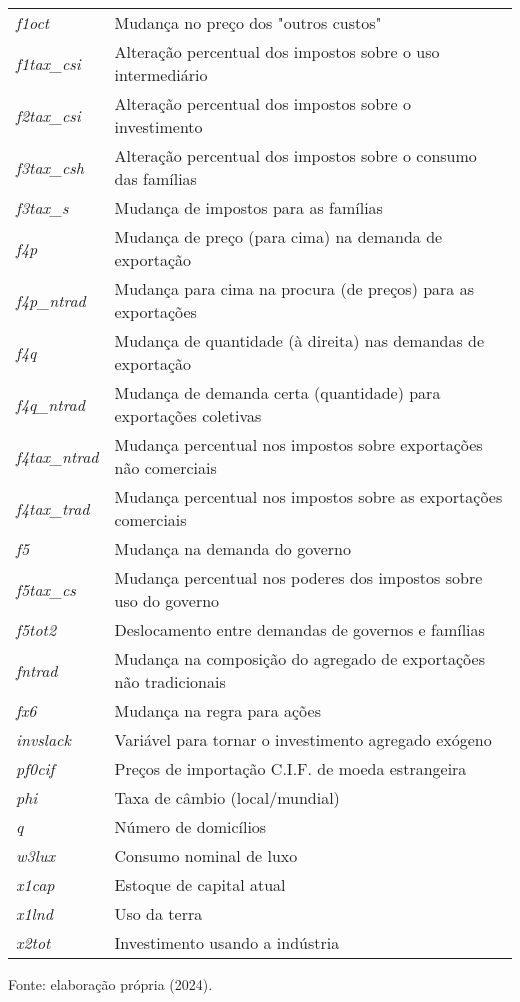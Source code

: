 \begin{apendicesenv}
\begin{quadro}[h]
\begin{threeparttable}
\begin{tabular}{|ll|}
				\textit{f1oct} & Mudança no preço dos "outros custos" \\
				\textit{f1tax\_csi} & Alteração percentual dos impostos sobre o uso intermediário \\
				\textit{f2tax\_csi} & Alteração percentual dos impostos sobre o investimento \\
				\textit{f3tax\_csh} & Alteração percentual dos impostos sobre o consumo das famílias \\
				\textit{f3tax\_s} & Mudança de impostos para as famílias \\
				\textit{f4p} & Mudança de preço (para cima) na demanda de exportação \\
				\textit{f4p\_ntrad} & Mudança para cima na procura (de preços) para as exportações \\
				\textit{f4q} & Mudança de quantidade (à direita) nas demandas de exportação \\
				\textit{f4q\_ntrad} & Mudança de demanda certa (quantidade) para exportações coletivas \\
				\textit{f4tax\_ntrad} & Mudança percentual nos impostos sobre exportações não comerciais \\
				\textit{f4tax\_trad} & Mudança percentual nos impostos sobre as exportações comerciais \\
				\textit{f5} & Mudança na demanda do governo \\
				\textit{f5tax\_cs} & Mudança percentual nos poderes dos impostos sobre uso do governo \\
				\textit{f5tot2} & Deslocamento entre demandas de governos e famílias \\
				\textit{fntrad} & Mudança na composição do agregado de exportações não tradicionais \\
				\textit{fx6} & Mudança na regra para ações \\
				\textit{invslack} & Variável para tornar o investimento agregado exógeno \\
				\textit{pf0cif} & Preços de importação C.I.F. de moeda estrangeira \\
				\textit{phi} & Taxa de câmbio (local/mundial) \\
				\textit{q} & Número de domicílios \\
				\textit{w3lux} & Consumo nominal de luxo \\
				\textit{x1cap} & Estoque de capital atual \\
				\textit{x1lnd} & Uso da terra \\
				\textit{x2tot} & Investimento usando a indústria \\ \hline
			\end{tabular}
			\begin{tablenotes}
				\footnotesize
				\item Fonte: elaboração própria (2024).
			\end{tablenotes}
			\end{threeparttable}
	\end{quadro}


\end{apendicesenv}
